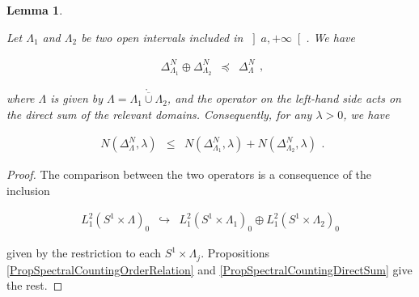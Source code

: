 \documentclass{jams-l}
\newtheorem{lemma}[theorem]{Lemma}
\theoremstyle{definition}
\theoremstyle{remark}
\numberwithin{equation}{section}
\begin{document}
        \begin{lemma}
        \label{LemNeumannBreakingInterval}
        
            Let $\Lambda_1$ and $\Lambda_2$ be two open intervals included in $\left] a, +\infty \right[$. We have
            
            \[ \begin{array}{lll}
                    \Delta^N_{\Lambda_1} \oplus \Delta^N_{\Lambda_2} & \preccurlyeq & \Delta^N_{\Lambda}
                \end{array} , \]
            
            \noindent where $\Lambda$ is given by $\Lambda = \mathring{\overline{\Lambda_1 \cup \Lambda_2}}$, and the operator on the left-hand side acts on the direct sum of the relevant domains. Consequently, for any $\lambda > 0$, we have
            
            \[ \begin{array}{lll}
                    N \left( \Delta^N_{\Lambda}, \lambda \right) & \leqslant & N \left( \Delta^N_{\Lambda_1}, \lambda \right) + N \left( \Delta^N_{\Lambda_2}, \lambda \right)
                \end{array} . \]
        
        \end{lemma}
        
        \begin{proof}
        
            The comparison between the two operators is a consequence of the inclusion
            
            \[ \begin{array}{lll}
                    L_1^2 \left( S^1 \times \Lambda \right)_0 & \hookrightarrow & L_1^2 \left( S^1 \times \Lambda_1 \right)_0 \oplus L_1^2 \left( S^1 \times \Lambda_2 \right)_0
                \end{array} \]
            
            \noindent given by the restriction to each $S^1 \times \Lambda_j$. Propositions \ref{PropSpectralCountingOrderRelation} and \ref{PropSpectralCountingDirectSum} give the rest.
        
        \end{proof}
        
\end{document}
